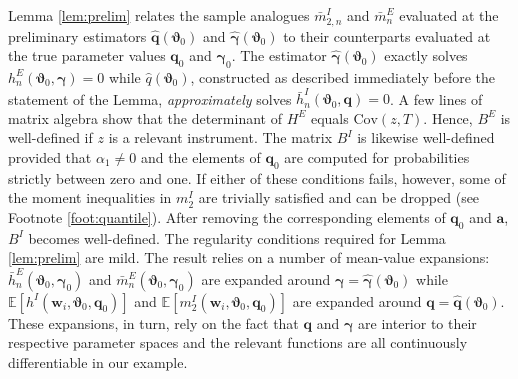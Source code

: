 Lemma \ref{lem:prelim} relates the sample analogues $\bar{m}_{2,n}^I$ and $\bar{m}_n^E$ evaluated at the preliminary estimators $\widehat{\mathbf{q}}(\boldsymbol{\vartheta}_0)$ and $\widehat{\boldsymbol{\gamma}}(\boldsymbol{\vartheta}_0)$ to their counterparts evaluated at the true parameter values $\mathbf{q}_0$ and $\boldsymbol{\gamma}_0$.
The estimator $\widehat{\boldsymbol{\gamma}}(\boldsymbol{\vartheta}_0)$ exactly solves $h_n^E(\boldsymbol{\vartheta}_0, \boldsymbol{\gamma})=0$ while $\widehat{q}(\boldsymbol{\vartheta}_0)$, constructed as described immediately before the statement of the Lemma, \emph{approximately} solves $\bar{h}_n^I(\boldsymbol{\vartheta}_0, \mathbf{q})=0$. 
A few lines of matrix algebra 
show that the determinant of $H^E$ equals $\mbox{Cov}(z,T)$.
Hence, $B^E$ is well-defined if $z$ is a relevant instrument.
The matrix $B^I$ is likewise well-defined provided that $\alpha_1\neq 0$ and the elements of $\mathbf{q}_0$ are computed for probabilities strictly between zero and one.
If either of these conditions fails, however, some of the moment inequalities in $m_2^I$ are trivially satisfied and can be dropped (see Footnote \ref{foot:quantile}).
After removing the corresponding elements of $\mathbf{q}_0$ and $\mathbf{a}$, $B^I$ becomes well-defined.
The regularity conditions required for Lemma \ref{lem:prelim} are mild.
The result relies on a number of mean-value expansions: $\bar{h}_n^E(\boldsymbol{\vartheta}_0, \boldsymbol{\gamma}_0)$ and $\bar{m}_n^E(\boldsymbol{\vartheta}_0, \boldsymbol{\gamma}_0)$ are expanded around $\boldsymbol{\gamma} = \widehat{\boldsymbol{\gamma}}(\boldsymbol{\vartheta}_0)$ while $\mathbb{E}[h^I(\mathbf{w}_i, \boldsymbol{\vartheta}_0, \mathbf{q}_0)]$ and $\mathbb{E}[m^I_2(\mathbf{w}_i, \boldsymbol{\vartheta}_0, \mathbf{q}_0)]$ are expanded around $\mathbf{q} = \widehat{\mathbf{q}}(\boldsymbol{\vartheta}_0)$.
These expansions, in turn, rely on the fact that $\mathbf{q}$ and $\boldsymbol{\gamma}$ are interior to their respective parameter spaces and the relevant functions are all continuously differentiable in our example.


